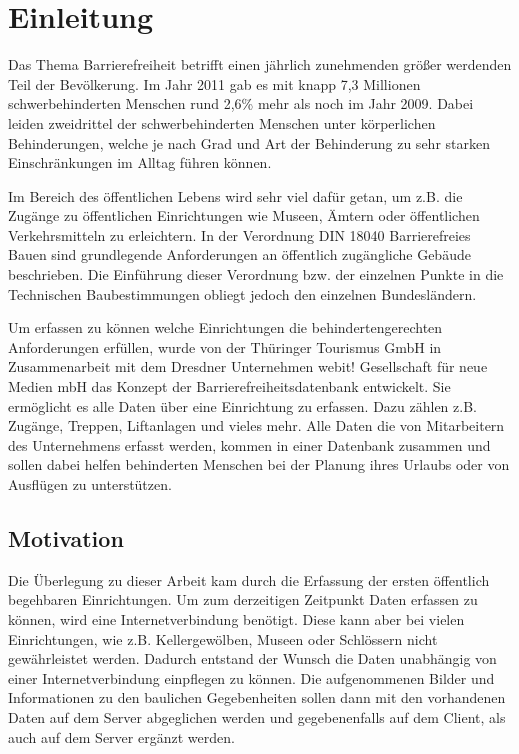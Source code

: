 %
\chapter{Einleitung}
\label{sec:Einleitung}


Das Thema Barrierefreiheit betrifft einen jährlich zunehmenden größer werdenden Teil der Bevölkerung. Im Jahr 2011 gab es mit knapp 7,3 Millionen schwerbehinderten Menschen rund 2,6\% mehr als noch im Jahr 2009.\cite[]{WEB:DESTATIS:2014} Dabei leiden zweidrittel der schwerbehinderten Menschen unter körperlichen Behinderungen, welche je nach Grad und Art der Behinderung zu sehr starken Einschränkungen im Alltag führen können.

Im Bereich des öffentlichen Lebens wird sehr viel dafür getan, um z.B. die Zugänge zu öffentlichen Einrichtungen wie Museen, Ämtern oder öffentlichen Verkehrsmitteln zu erleichtern. In der Verordnung DIN 18040 Barrierefreies Bauen sind grundlegende Anforderungen an öffentlich zugängliche Gebäude beschrieben. Die Einführung dieser Verordnung bzw. der einzelnen Punkte in die Technischen Baubestimmungen obliegt jedoch den einzelnen Bundesländern.\cite[]{WEB:DIN18040:2010}

Um erfassen zu können welche Einrichtungen die behindertengerechten Anforderungen erfüllen, wurde von der Thüringer Tourismus GmbH in Zusammenarbeit mit dem Dresdner Unternehmen webit! Gesellschaft für neue Medien mbH das Konzept der Barrierefreiheitsdatenbank entwickelt. Sie ermöglicht es alle Daten über eine Einrichtung zu erfassen. Dazu zählen z.B. Zugänge, Treppen, Liftanlagen und vieles mehr. Alle Daten die von Mitarbeitern des Unternehmens erfasst werden, kommen in einer Datenbank zusammen und sollen dabei helfen behinderten Menschen bei der Planung ihres Urlaubs oder von Ausflügen zu unterstützen.

\section{Motivation}
\label{sec:motivation:mot}

Die Überlegung zu dieser Arbeit kam durch die Erfassung der ersten öffentlich begehbaren Einrichtungen. Um zum derzeitigen Zeitpunkt Daten erfassen zu können, wird eine Internetverbindung benötigt. Diese kann aber bei vielen Einrichtungen, wie z.B. Kellergewölben, Museen oder Schlössern nicht gewährleistet werden. Dadurch entstand der Wunsch die Daten unabhängig von einer Internetverbindung einpflegen zu können. Die aufgenommenen Bilder und Informationen zu den baulichen Gegebenheiten sollen dann mit den vorhandenen Daten auf dem Server abgeglichen werden und gegebenenfalls auf dem Client, als auch auf dem Server ergänzt werden.

